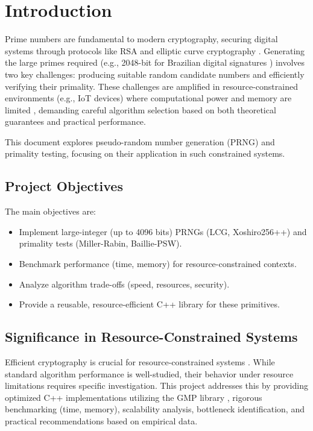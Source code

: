 \section{Introduction}

Prime numbers are fundamental to modern cryptography, securing digital systems through protocols like RSA and elliptic curve cryptography \cite{rivest1978, crandall2005}. Generating the large primes required (e.g., 2048-bit for Brazilian digital signatures \cite{MP2200-2-2001, ITI-04-2005}) involves two key challenges: producing suitable random candidate numbers and efficiently verifying their primality. These challenges are amplified in resource-constrained environments (e.g., IoT devices) where computational power and memory are limited \cite{resource_constrained, prng_iot}, demanding careful algorithm selection based on both theoretical guarantees and practical performance.

This document explores pseudo-random number generation (PRNG) and primality testing, focusing on their application in such constrained systems.

\subsection{Project Objectives}

The main objectives are:

\begin{itemize}
    \item Implement large-integer (up to 4096 bits) PRNGs (LCG, Xoshiro256++) and primality tests (Miller-Rabin, Baillie-PSW).
    \item Benchmark performance (time, memory) for resource-constrained contexts.
    \item Analyze algorithm trade-offs (speed, resources, security).
    \item Provide a reusable, resource-efficient C++ library for these primitives.
\end{itemize}

\subsection{Significance in Resource-Constrained Systems}

Efficient cryptography is crucial for resource-constrained systems \cite{embedded_prng}. While standard algorithm performance is well-studied, their behavior under resource limitations requires specific investigation. This project addresses this by providing optimized C++ implementations utilizing the GMP library \cite{granlund2012}, rigorous benchmarking (time, memory), scalability analysis, bottleneck identification, and practical recommendations based on empirical data.

